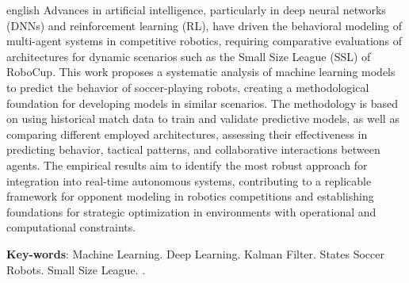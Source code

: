 \begin{resumo}[Abstract]
 \begin{otherlanguage*}{english}
Advances in artificial intelligence, particularly in deep neural networks (DNNs) and reinforcement learning (RL), have driven the behavioral modeling of multi-agent systems in competitive robotics, requiring comparative evaluations of architectures for dynamic scenarios such as the Small Size League (SSL) of RoboCup. This work proposes a systematic analysis of machine learning models to predict the behavior of soccer-playing robots, creating a methodological foundation for developing models in similar scenarios. The methodology is based on using historical match data to train and validate predictive models, as well as comparing different employed architectures, assessing their effectiveness in predicting behavior, tactical patterns, and collaborative interactions between agents. The empirical results aim to identify the most robust approach for integration into real-time autonomous systems, contributing to a replicable framework for opponent modeling in robotics competitions and establishing foundations for strategic optimization in environments with operational and computational constraints.

   \vspace{\onelineskip}
 
   \noindent 
   \textbf{Key-words}: Machine Learning. Deep Learning. Kalman Filter. States Soccer Robots. Small Size League.
.
 \end{otherlanguage*}
\end{resumo}
